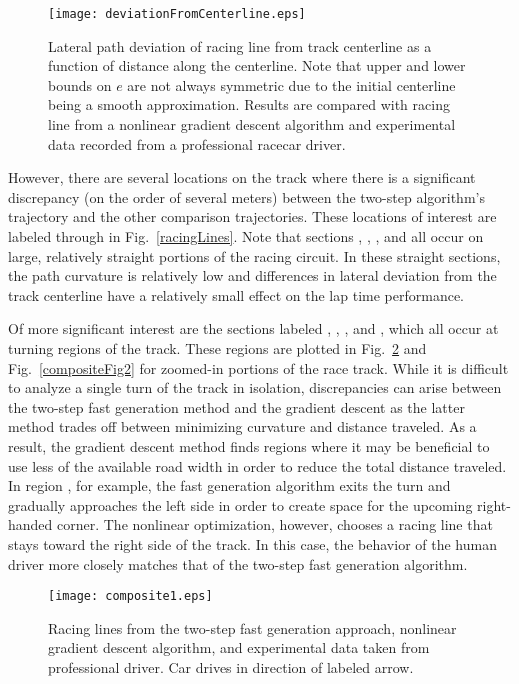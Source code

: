 \begin{figure}
\centering
\texttt{[image: deviationFromCenterline.eps]}
\caption[Lateral path deviation of racing line from track centerline as a function of distance along the centerline.]{Lateral path deviation of racing line from track centerline as a function of distance along the centerline. Note that upper and lower bounds on $e$ are not always symmetric
due to the initial centerline being a smooth approximation. Results
are compared with racing line from a nonlinear gradient descent algorithm and experimental data recorded from a professional racecar driver.}
\label{fig:pathDeviation}
\end{figure}	

However, there are several locations on the track where there is a significant discrepancy (on the order of several meters) between the two-step algorithm's trajectory and the 
other comparison trajectories. These locations of interest are labeled  through  in Fig.~\ref{racingLines}.
Note that sections , , , and  all occur on large, relatively straight portions of the racing circuit.
In these straight sections, the path curvature is relatively low and differences in lateral deviation from the track centerline have a relatively small
effect on the lap time performance.   

Of more significant interest are the sections labeled , , , and , which all occur at turning regions of the track.
These regions are plotted in Fig.~\ref{compositeFig1} and Fig.~\ref{compositeFig2} for zoomed-in portions of the race track. While it is difficult to analyze a single turn
of the track in isolation, discrepancies can arise between the two-step fast generation method and the gradient descent as the latter method trades off 
between minimizing curvature and distance traveled. As a result, the gradient descent method finds
 regions where it may be beneficial to use less of the available road width in order to reduce the total distance
traveled. In region , for example, the fast generation algorithm exits the turn and gradually approaches the left side in order to create space for the
upcoming right-handed corner. The nonlinear optimization, however, chooses a racing line that stays toward the right side of the track. 
In this case, the behavior of the human driver more closely matches that of the two-step fast generation algorithm.

 \begin{figure}[tb]
\centering
\texttt{[image: composite1.eps]}
\caption[Racing lines from the two-step fast generation approach, nonlinear gradient descent algorithm, and experimental data taken
from professional driver.]{Racing lines from the two-step fast generation approach, nonlinear gradient descent algorithm, and experimental data taken
from professional driver. Car drives in direction of labeled arrow.}
\label{compositeFig1}
\end{figure}

